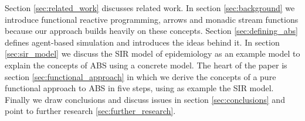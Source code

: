 Section \ref{sec:related_work} discusses related work. In section \ref{sec:background} we introduce functional reactive programming, arrows and monadic stream functions because our approach builds heavily on these concepts. Section \ref{sec:defining_abs} defines agent-based simulation and introduces the ideas behind it. In section \ref{sec:sir_model} we discuss the SIR model of epidemiology as an example model to explain the concepts of ABS using a concrete model. The heart of the paper is section \ref{sec:functional_approach} in which we derive the concepts of a pure functional approach to ABS in five steps, using as example the SIR model. Finally we draw conclusions and discuss issues in section \ref{sec:conclusions} and point to further research \ref{sec:further_research}.

